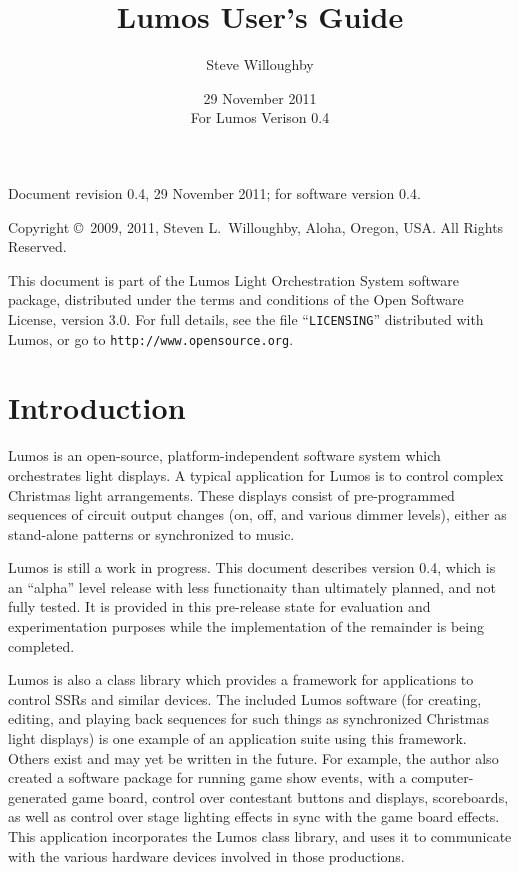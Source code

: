 \documentclass{article}
\begin{document}
\title{Lumos User's Guide}
\author{Steve Willoughby}
\date{29 November 2011 \\ For Lumos Verison 0.4}
\maketitle
\tableofcontents
\pagebreak
\vfill
\begin{flushleft}
Document revision 0.4, 29 November 2011;
for software version 0.4.

Copyright \copyright\ 2009, 2011, Steven L.\ Willoughby,
Aloha, Oregon, USA.  All Rights Reserved.

This document is part of the Lumos Light Orchestration System software package, distributed under the terms and conditions of the Open Software License, version 3.0.  For full details, see the file ``{\tt LICENSING}'' distributed with Lumos, or go to {\tt http://www.opensource.org}.
\end{flushleft}
\pagebreak

\section{Introduction}
Lumos is an open-source, platform-independent software system which
orchestrates light displays.  A typical application for Lumos is to control
complex Christmas light arrangements.  These displays consist of
pre-programmed sequences of circuit output changes (on, off, and various
dimmer levels), either as stand-alone patterns or synchronized to music.

Lumos is still a work in progress.  This document describes version 0.4, which
is an ``alpha'' level release with less functionaity than ultimately planned,
and not fully tested.  It is provided in this pre-release state for evaluation 
and experimentation purposes while the implementation of the remainder is 
being completed.

Lumos is also a class library which provides a framework for applications
to control SSRs and similar devices.  The included Lumos software (for creating,
editing, and playing back sequences for such things as synchronized 
Christmas light displays) is one example of an application suite using this
framework.  Others exist and may yet be written in the future.  For example,
the author also created a software package for running game show events,
with a computer-generated game board, control over contestant buttons and
displays, scoreboards, as well as control over stage lighting effects
in sync with the game board effects.  This application incorporates the
Lumos class library, and uses it to communicate with the various hardware
devices involved in those productions.
\end{document}
